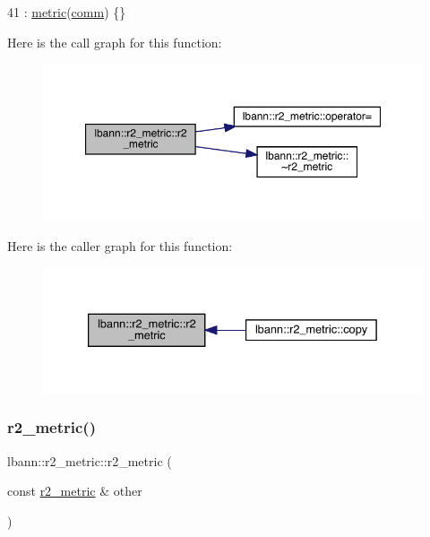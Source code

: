 \begin{DoxyCode}
41 : \hyperlink{classlbann_1_1metric_a3cd2d4f7dcbf94f70b3b8560a3171d9d}{metric}(\hyperlink{file__io_8cpp_ab048c6f9fcbcfaa57ce68b00263dbebe}{comm}) \{\}
\end{DoxyCode}
Here is the call graph for this function\+:\nopagebreak
\begin{figure}[H]
\begin{center}
\leavevmode
\includegraphics[width=350pt]{classlbann_1_1r2__metric_a9c6bffbb4724c77a8e6f8b1a2e7b27c7_cgraph}
\end{center}
\end{figure}
Here is the caller graph for this function\+:\nopagebreak
\begin{figure}[H]
\begin{center}
\leavevmode
\includegraphics[width=333pt]{classlbann_1_1r2__metric_a9c6bffbb4724c77a8e6f8b1a2e7b27c7_icgraph}
\end{center}
\end{figure}
\mbox{\label{classlbann_1_1r2__metric_a42a125bad0a3ba5e6b229d89b893d3e6}} 
\subsubsection{\texorpdfstring{r2\+\_\+metric()}{r2\_metric()}\hspace{0.1cm}{\footnotesize\ttfamily [2/2]}}
{\footnotesize\ttfamily lbann\+::r2\+\_\+metric\+::r2\+\_\+metric (\begin{DoxyParamCaption}\item[{const \hyperlink{classlbann_1_1r2__metric}{r2\+\_\+metric} \&}]{other }\end{DoxyParamCaption})\hspace{0.3cm}{\ttfamily [default]}}

